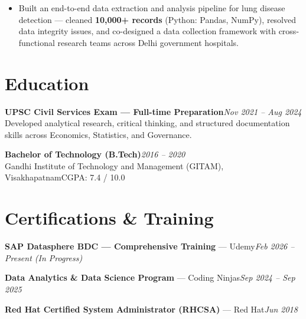 \documentclass[10pt, letterpaper]{article}
\begin{document}
\begin{itemize}
  \item Built an end-to-end data extraction and analysis pipeline for lung disease detection — cleaned \textbf{10,000+ records} (Python: Pandas, NumPy), resolved data integrity issues, and co-designed a data collection framework with cross-functional research teams across Delhi government hospitals.
\end{itemize}

\section{Education}

{\bfseries UPSC Civil Services Exam — Full-time Preparation}\hfill{\small\color{muted}\textit{Nov 2021 – Aug 2024}}\\
{\small\color{muted}Developed analytical research, critical thinking, and structured documentation skills across Economics, Statistics, and Governance.}

\vspace{2pt}
{\bfseries Bachelor of Technology (B.Tech)}\hfill{\small\color{muted}\textit{2016 – 2020}}\\
{\small\color{muted}Gandhi Institute of Technology and Management (GITAM), Visakhapatnam\hfill CGPA: 7.4 / 10.0}

\section{Certifications \& Training}

{\bfseries SAP Datasphere BDC — Comprehensive Training} — Udemy\hfill{\small\color{muted}\textit{Feb 2026 – Present \emph{(In Progress)}}}

\vspace{1pt}
{\bfseries Data Analytics \& Data Science Program} — Coding Ninjas\hfill{\small\color{muted}\textit{Sep 2024 – Sep 2025}}

\vspace{1pt}
{\bfseries Red Hat Certified System Administrator (RHCSA)} — Red Hat\hfill{\small\color{muted}\textit{Jun 2018}}

\end{document}
